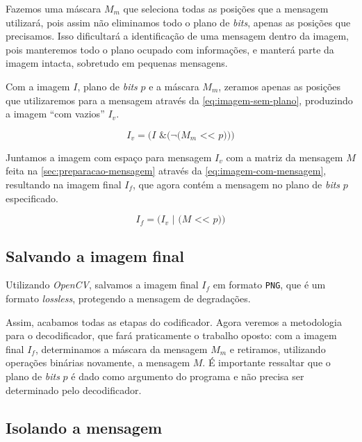 \documentclass[brazilian,a4paper,twocolumn]{article}
\begin{document}
        Fazemos uma máscara $M_m$ que seleciona todas as posições que a mensagem utilizará, pois assim não eliminamos todo o plano de \textit{bits}, apenas as posições que precisamos. Isso dificultará a identificação de uma mensagem dentro da imagem, pois manteremos todo o plano ocupado com informações, e manterá parte da imagem intacta, sobretudo em pequenas mensagens.

        Com a imagem $I$, plano de \textit{bits} $p$ e a máscara $M_m$, zeramos apenas as posições que utilizaremos para a mensagem através da \cref{eq:imagem-sem-plano}, produzindo a imagem ``com vazios'' $I_v$.

        \begin{equation}
        \label{eq:imagem-sem-plano}
            I_v = \texttt{($I$ \&  ($\lnot$($M_m$ << $p$)))}
        \end{equation}


        Juntamos a imagem com espaço para mensagem $I_v$ com a matriz da mensagem $M$ feita na \cref{sec:preparacao-mensagem} através da \cref{eq:imagem-com-mensagem}, resultando na imagem final $I_f$, que agora contém a mensagem no plano de \textit{bits} $p$ especificado.

        \begin{equation}
        \label{eq:imagem-com-mensagem}
            I_f = \texttt{($I_v$ | ($M$ << $p$))}
        \end{equation}

    \subsection{Salvando a imagem final}

        Utilizando \emph{OpenCV}, salvamos a imagem final $I_f$ em formato \texttt{PNG}, que é um formato \textit{lossless}, protegendo a mensagem de degradações.

        Assim, acabamos todas as etapas do codificador. Agora veremos a metodologia para o decodificador, que fará praticamente o trabalho oposto: com a imagem final $I_f$, determinamos a máscara da mensagem $M_m$ e retiramos, utilizando operações binárias novamente, a mensagem $M$. É importante ressaltar que o plano de \textit{bits} $p$ é dado como argumento do programa e não precisa ser determinado pelo decodificador.

    \subsection{Isolando a mensagem}
\end{document}
